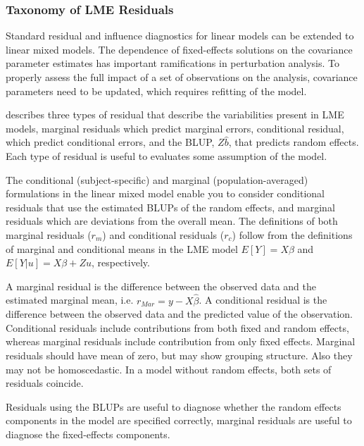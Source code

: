 \documentclass[12pt, a4paper]{report}
\theoremstyle{definition}
\theoremstyle{remark}
\begin{document}
\subsubsection{Taxonomy of LME Residuals}
Standard residual and influence diagnostics for linear models can
be extended to linear mixed models. The dependence of
fixed-effects solutions on the covariance parameter estimates has
important ramifications in perturbation analysis. To properly assess the
full impact of a set of observations on the analysis, covariance
parameters need to be updated, which requires refitting of the
model.

\citet{PB} describes three types of residual that describe the variabilities
present in LME models, marginal residuals which predict marginal errors, conditional residual, which predict conditional errors, and the BLUP, $ {Z\hat{b}}$, that predicts random effects. Each type of residual is useful to evaluates some assumption of the model.

The conditional (subject-specific) and marginal (population-averaged) formulations in the linear mixed model enable you to consider conditional residuals that use the estimated BLUPs of the random effects, and marginal residuals which are deviations from the overall mean. The definitions of both marginal residuals ($r_m$) and conditional residuals ($r_c$) follow from the definitions of marginal and conditional means in the LME model 
$E[{Y}] = {X}{\beta}$ and $E[{Y|{u}}] = {X}{\beta} + {Z}{u}$, respectively.

A marginal residual is the difference between the observed data and the estimated marginal mean, i.e. $r_{Mar} = y - X \hat{\beta}$. A conditional residual is the difference between the observed data and the predicted value of the observation. 
 Conditional residuals include contributions from both fixed and random effects, whereas marginal residuals include contribution from only fixed effects. Marginal residuals should have mean of zero, but may show grouping structure. Also they may not be homoscedastic. In a model without random effects, both sets of residuals coincide.



Residuals using the BLUPs are useful to diagnose whether the random effects components in the model are specified correctly, marginal residuals are useful to diagnose the fixed-effects components.

\end{document}
